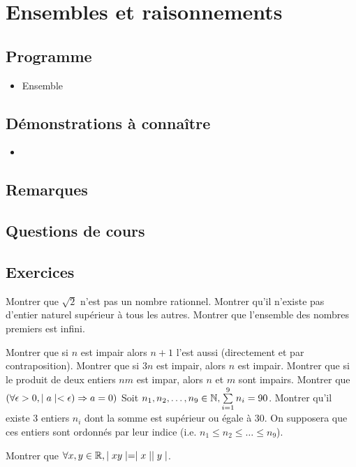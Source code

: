  \chapter{Ensembles et raisonnements}
 
\section{Programme}
	\begin{itemize}
	\item Ensemble
 \end{itemize}

\section{Démonstrations à connaître}
	\begin{itemize}
		\item 
\end{itemize}


\section{Remarques}

	
	
	


\section{Questions de cours}	




\section{Exercices}


\begin{exercise}[subtitle= Absurde, difficulty=*]
	\begin{tasks} 
		\task 	Montrer que $\sqrt{2}$  n'est pas un nombre rationnel.
		\task Montrer qu'il n'existe pas d'entier naturel supérieur à tous les autres. 
		\task Montrer que l'ensemble des nombres premiers est infini.   
	\end{tasks}
\end{exercise}

\begin{exercise}[subtitle= Contraposition, difficulty=*]
		\begin{tasks} 
			\task Montrer que si $n$ est impair alors $n+1$ l'est aussi (directement et par contraposition).
			\task Montrer que si $3n$ est impair, alors $n$ est impair.  
			\task Montrer que si le produit de deux entiers $nm$ est impar, alors $n$ et $m$ sont impairs. 
			\task Montrer que $(\forall \epsilon > 0, \mid a \mid < \epsilon) \Rightarrow a=0 )$
			\task Soit $n_1, n_2, \dots, n_9 \in \mathbb{N}, \sum\limits_{i=1}^9 n_i =90$. Montrer qu'il existe 3 entiers $n_i$ dont la somme est supérieur ou égale à 30. On supposera que ces entiers sont ordonnés par leur indice (i.e. $n_1 \le n_2 \le \dots \le n_9$). 
		\end{tasks}
\end{exercise}



\begin{exercise}[subtitle= Disjonction des cas, difficulty=*]
	\begin{tasks} 
		\task Montrer que $\forall x,y \in \mathbb{R},  \mid xy \mid =\mid x \mid\mid y \mid$.
		\task   
	\end{tasks}
\end{exercise}

